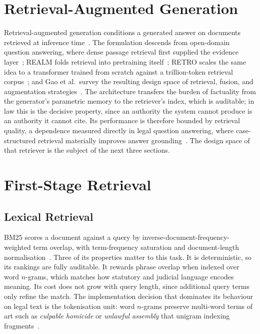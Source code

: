 \documentclass{mnnit}
\begin{document}
\section{Retrieval-Augmented Generation}
Retrieval-augmented generation conditions a generated answer on
documents retrieved at inference time~\cite{rag}. The
formulation descends from open-domain question answering, where
dense passage retrieval first supplied the evidence
layer~\cite{dpr}; REALM folds retrieval into pretraining
itself~\cite{guu2020realm}; RETRO scales the same idea to a
transformer trained from scratch against a trillion-token
retrieval corpus~\cite{borgeaud2022retro}; and Gao et al.\
survey the resulting design space of retrieval, fusion, and
augmentation strategies~\cite{gao2023ragsurvey}. The
architecture transfers the burden of factuality from the
generator's parametric memory to the retriever's index, which is
auditable; in law this is the decisive property, since an
authority the system cannot produce is an authority it cannot
cite. Its performance is therefore bounded by retrieval quality,
a dependence measured directly in legal question answering,
where case-structured retrieval materially improves answer
grounding~\cite{wiratunga2024cbrrag}. The design space of that
retriever is the subject of the next three sections.

\section{First-Stage Retrieval}
\subsection{Lexical Retrieval}
BM25 scores a document against a query by
inverse-document-frequency-weighted term overlap, with
term-frequency saturation and document-length
normalisation~\cite{bm25}. Three of its properties matter to this
task. It is deterministic, so its rankings are fully auditable.
It rewards phrase overlap when indexed over word $n$-grams, which
matches how statutory and judicial language encodes meaning.
Its cost does not grow with query length, since additional query
terms only refine the match. The implementation decision that
dominates its behaviour on legal text is the tokenisation unit:
word $n$-grams preserve multi-word terms of art such as
\emph{culpable homicide} or \emph{unlawful assembly} that unigram
indexing fragments~\cite{bm25s}.
\end{document}
